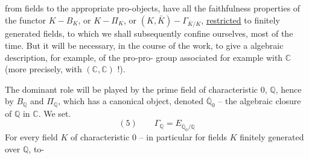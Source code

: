 from fields to the appropriate pro-objects,  have all the faithfulness properties of the functor $K-B_K$, or $K-\Pi_K$, or $(K,\bar K)-\Gamma_{\bar K/K}$, \uline{restricted} to  finitely generated fields, to which we shall subsequently confine ourselves, most of the time. But it will be necessary, in the course of the work, to give a  algebraic description, for example, of the pro-pro- group associated for example with $\mathbb C$ (more precisely, with $(\mathbb C,\mathbb C)$ !).

The dominant role will be played by the prime field of characteristic $0$, $\mathbb Q$, hence by $B_{\mathbb Q}$ and $\Pi_{\mathbb Q}$, which has a canonical object, denoted $\overline{\mathbb Q}_0$ -- the algebraic closure of $\mathbb Q$ in $\mathbb C$. We set.
\[
(5)\qquad \Gamma_{\mathbb Q}=E_{\overline{\mathbb Q}_0/\mathbb Q}
\]
For every field $K$ of characteristic $0$ -- in particular for fields $K$ finitely generated over $\mathbb Q$, to-
